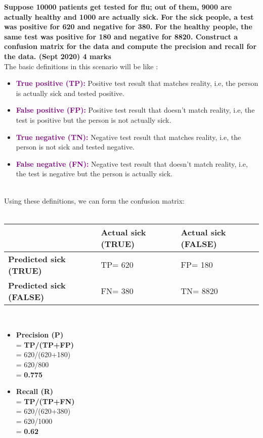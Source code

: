 \textbf{\textcolor{LightMagenta}{Suppose 10000 patients get tested for flu; out of them, 9000 are actually healthy and 1000 are actually sick. For the sick people, a test was positive for 620 and negative for 380. For the healthy people, the same test was positive for 180 and negative for 8820. Construct a confusion matrix for the data and compute the precision and recall for the data. (Sept 2020) \hfill 4 marks}} \\[5pt]
The basic definitions in this scenario will be like :
\begin{itemize}
        \item \textbf{\textcolor{purple}{True positive (TP):}} Positive test result that matches reality, i.e, the person is actually sick and tested positive.
        \item \textbf{\textcolor{purple}{False positive (FP):}} Positive test result that  doesn't match reality, i.e, the test is positive but the person is not actually sick.
        \item \textbf{\textcolor{purple}{True negative (TN):}} Negative test result that matches reality, i.e, the person is not sick and tested negative.
        \item \textbf{\textcolor{purple}{False negative (FN):}} Negative test result that doesn't match reality, i.e, the test is negative but the person is actually sick.
\end{itemize}
\\ Using these definitions, we can form the confusion matrix:\\ \\
\begin{tabularx}{0.8\textwidth} { 
  | >{\raggedright\arraybackslash}X 
  | >{\centering\arraybackslash}X 
  | >{\centering\arraybackslash}X | }
 \hline
  & \textbf{Actual sick (TRUE)} & \textbf{Actual sick (FALSE)} \\
 \hline
 \textbf{Predicted sick (TRUE)}  & TP= 620  & FP= 180 \\
 \hline
 \textbf{Predicted sick (FALSE)}  & FN= 380 & TN= 8820  \\
\hline
\end{tabularx} \\
\begin{enumerate}
    \begin{itemize}
        \item \textbf{Precision (P)} \\= \textbf{TP/(TP+FP)} \\= 620/(620+180) \\= 620/800 \\= \textbf{0.775}
        \item \textbf{Recall (R)} \\= \textbf{TP/(TP+FN)} \\= 620/(620+380) \\= 620/1000 \\= \textbf{0.62}
    \end{itemize}
\end{enumerate}